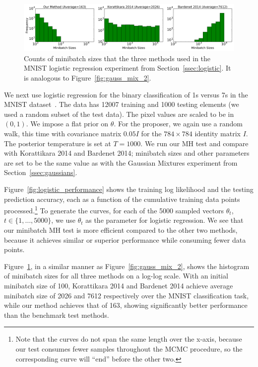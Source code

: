 \documentclass{article}
\begin{document}
\begin{figure}[t]
	\centering
	\includegraphics[width=1\linewidth]{minibatch_size_logistic.png}
	\caption{
    Counts of minibatch sizes that the three methods used in the MNIST logistic
    regression experiment from Section~\ref{ssec:logistic}. It is analogous to
    Figure~\ref{fig:gauss_mix_2}.
    }
	\label{fig:logistic_minibatch}
\end{figure}

We next use logistic regression for the binary classification of 1s versus 7s in
the MNIST dataset~\cite{lecun-mnisthandwrittendigit-2010}. The data has 12007
training and 1000 testing elements (we used a random subset of the test data).
The pixel values are scaled to be in $(0,1)$.  We impose a flat prior on
$\theta$. For the proposer, we again use a random walk, this time with
covariance matrix $0.05I$ for the $784\times 784$ identity matrix $I$. The
posterior temperature is set at $T=1000$.  We run our MH test and compare with
Korattikara 2014 and Bardenet 2014; minibatch sizes and other parameters are set
to be the same value as with the Gaussian Mixtures experiment from
Section~\ref{ssec:gaussians}.

Figure~\ref{fig:logistic_performance} shows the training log likelihood and the
testing prediction accuracy, each as a function of the cumulative training data
points processed.\footnote{Note that the curves do not span the same length over
the x-axis, because our test consumes fewer samples throughout the MCMC
procedure, so the corresponding curve will ``end'' before the other two.} To
generate the curves, for each of the 5000 sampled vectors $\theta_t$,
$t\in\{1,\ldots,5000\}$, we use $\theta_t$ as the parameter for logistic
regression.  We see that our minibatch MH test is more efficient compared to the
other two methods, because it achieves similar or superior performance while
consuming fewer data points.

Figure~\ref{fig:logistic_minibatch}, in a similar manner as
Figure~\ref{fig:gauss_mix_2}, shows the histogram of minibatch sizes for all
three methods on a log-log scale. With an initial minibatch size of 100,
Korattikara 2014 and Bardenet 2014 achieve average minibatch size of 2026 and
7612 respectively over the MNIST classification task, while our method achieves
that of 163, showing significantly better performance than the benchmark test
methods.
\end{document}
